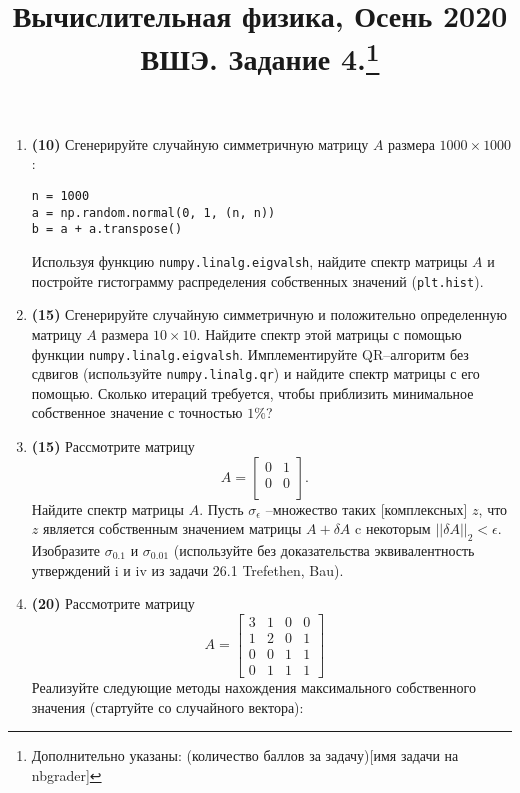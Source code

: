 \documentclass[prb,papersize=a4paper,notitlepage]{revtex4-1}%
\begin{document}
\title{Вычислительная физика, Осень 2020 ВШЭ. Задание 4.\footnote{Дополнительно указаны: (количество баллов за задачу)[имя задачи на nbgrader]}}
\maketitle
\begin{enumerate}
\item \textbf{(10)} Сгенерируйте случайную симметричную матрицу $A$ размера $1000 \times 1000$:
\lstset{language=Python}
\lstset{frame=lines}
\lstset{basicstyle=\ttfamily}
\begin{lstlisting}
n = 1000
a = np.random.normal(0, 1, (n, n))
b = a + a.transpose()
\end{lstlisting}
Используя функцию \lstinline{numpy.linalg.eigvalsh}, найдите спектр матрицы $A$ и постройте гистограмму распределения собственных значений (\lstinline{plt.hist}).
\item \textbf{(15)} Сгенерируйте случайную симметричную и положительно определенную матрицу $A$ размера $10 \times 10$. Найдите спектр этой матрицы с помощью функции \lstinline{numpy.linalg.eigvalsh}. Имплементируйте $\textrm{QR}$--алгоритм без сдвигов (используйте \lstinline{numpy.linalg.qr}) и найдите спектр матрицы с его помощью. Сколько итераций требуется, чтобы приблизить минимальное собственное значение с точностью $1\%$?
\item \textbf{(15)} Рассмотрите матрицу 
$$
A=\begin{bmatrix}
0 & 1\\
0 & 0\\
\end{bmatrix}.\quad
$$
Найдите спектр матрицы $A$. Пусть $\sigma_\epsilon$ --множество таких [комплексных] $z$, что $z$ является собственным значением матрицы $A+\delta A$ c некоторым $||\delta A||_2<\epsilon$. Изобразите $\sigma_{0.1}$ и $\sigma_{0.01}$ (используйте без доказательства эквивалентность утверждений i и iv из задачи 26.1 Trefethen, Bau).
\item \textbf{(20)} Рассмотрите матрицу 
$$
A=\begin{bmatrix}
3 & 1 & 0 & 0\\
1 & 2 & 0 & 1\\
0 & 0 & 1 & 1\\
0 & 1 & 1 & 1
\end{bmatrix}\quad
$$
Реализуйте следующие методы нахождения максимального собственного значения (стартуйте со случайного вектора):
\begin{itemize}

\end{itemize}
\end{enumerate}
\end{document}
